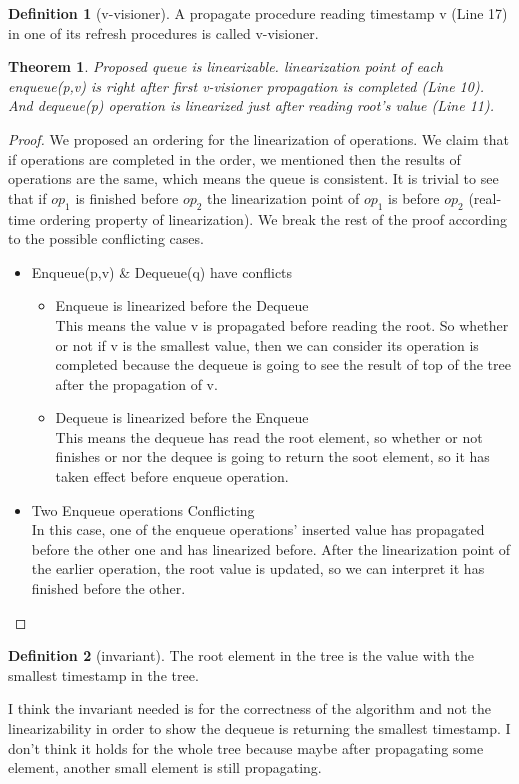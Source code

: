 \documentclass[11pt]{article}
\newtheorem{theorem}{Theorem}
\theoremstyle{definition}
\newtheorem{definition}{Definition}
\begin{document}
\begin{definition}[v-visioner]
  A propagate procedure reading timestamp v (Line 17) in one of its refresh procedures is called v-visioner.
\end{definition}

\begin{theorem}
Proposed queue is linearizable. linearization point of each enqueue(p,v) is right after first v-visioner propagation is completed (Line 10). And dequeue(p) operation is linearized just after reading root's value (Line 11).
\end{theorem}
\begin{proof}
We proposed an ordering for the linearization of operations. We claim that if operations are completed in the order, we mentioned then the results of operations are the same, which means the queue is consistent. It is trivial to see that if $op_1$ is finished before $op_2$ the linearization point of $op_1$ is before $op_2$ (real-time ordering  property of linearization). We break the rest of the proof according to the possible conflicting cases.


\begin{itemize}
\item Enqueue(p,v) \& Dequeue(q) have conflicts
\begin{itemize}
\item Enqueue is linearized before the Dequeue\\
This means the value v is propagated before reading the root. So whether or not if v is the smallest value, then we can consider its operation is completed because the dequeue is going to see the result of top of the tree after the propagation of v.
\item Dequeue is linearized before the Enqueue\\
This means the dequeue has read the root element, so whether or not finishes or nor the dequee is going to return the soot element, so it has taken effect before enqueue operation.
\end{itemize}
\item Two Enqueue operations Conflicting \\
In this case, one of the enqueue operations' inserted value has propagated before the other one and has linearized before. After the linearization point of the earlier operation, the root value is updated, so we can interpret it has finished before the other.
\end{itemize}
\end{proof}

\begin{definition}[invariant]
The root element in the tree is the value with the smallest timestamp in the tree.
\end{definition}
I think the invariant needed is for the correctness of the algorithm and not the linearizability in order to show the dequeue is returning the smallest timestamp. I don't think it holds for the whole tree because maybe after propagating some element, another small element is still propagating.
\end{document}
